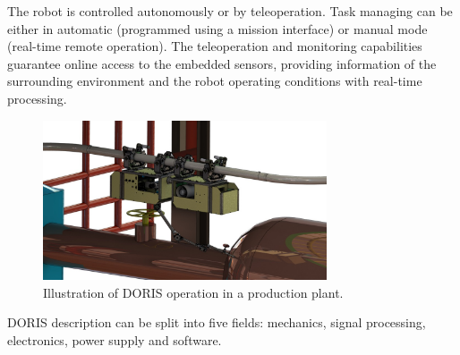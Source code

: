 \documentclass{ifacconf}
\begin{document}
The robot is controlled autonomously or by teleoperation. Task managing can be
either in automatic (programmed using a mission interface) or manual mode
(real-time remote operation). The teleoperation and monitoring capabilities
guarantee online access to the embedded sensors, providing information of the
surrounding environment and the robot operating conditions with real-time
processing.

\begin{figure}[ht]
\centering
\includegraphics[width=8.4cm]{figs/cenario5.jpg}
\caption{Illustration of DORIS operation in a production plant.}
\label{fig:DORIS-overview}
\end{figure}

DORIS description can be split into five fields: mechanics,
signal processing, electronics, power supply and software.


\end{document}
